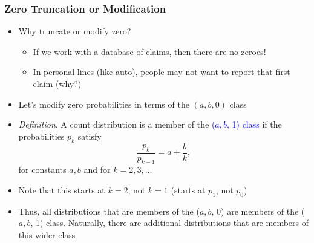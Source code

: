 \documentclass{beamer}
\begin{document}
\begin{frame}%
 \frametitle{Zero Truncation or Modification}
\begin{itemize}
\item Why truncate or modify zero?
\begin{itemize}
\item If we work with a database of claims, then there are no zeroes!
\item In personal lines (like auto), people may not want to report that first claim
(why?) \vspace{2mm}
 \end{itemize}
\item Let's modify zero probabilities in terms of the $(a,b,0)$
class \vspace{2mm}
\item \textit{Definition}. A count distribution is a member of the \textcolor{blue}{($a, b$, 1) class} if the probabilities $p_k$ satisfy
\begin{equation*}
\frac{p_k}{p_{k-1}}=a+\frac{b}{k},
\end{equation*}
for constants $a,b$ and for $k=2,3, \ldots $ \vspace{2mm}
\item Note that this starts at $k=2$, not $k=1$ (starts at $p_1$, not
$p_0$) \vspace{2mm}
\item Thus, all distributions that are members of the ($a, b$, 0) are members of the ($a, b$, 1) class. Naturally, there are additional distributions that are members of this wider class
 \end{itemize}
\end{frame}
\end{document}
